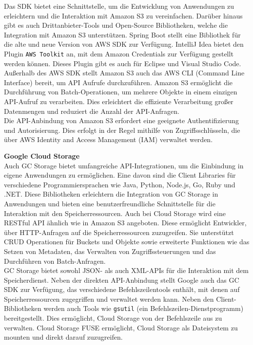 Das SDK bietet eine Schnittstelle, um die Entwicklung von Anwendungen zu erleichtern und die Interaktion mit Amazon S3 zu vereinfachen. Darüber hinaus gibt es auch Drittanbieter-Tools und Open-Source Bibliotheken, welche die Integration mit Amazon S3 unterstützen. Spring Boot stellt eine Bibliothek für die alte und neue Version von AWS SDK zur Verfügung. IntelliJ Idea bietet den Plugin \verb|AWS Toolkit| an, mit dem Amazon Credentials zur Verfügung gestellt werden können. Dieses Plugin gibt es auch für Eclipse und Visual Studio Code.\\

Außerhalb des AWS SDK stellt Amazon S3 auch das AWS CLI (Command Line Interface) bereit, um API Aufrufe durchzuführen. Amazon S3 ermöglicht die Durchführung von Batch-Operationen, um mehrere Objekte in einem einzigen API-Aufruf zu verarbeiten. Dies erleichtert die effiziente Verarbeitung großer Datenmengen und reduziert die Anzahl der API-Anfragen.\\

Die API-Anbindung von Amazon S3 erfordert eine geeignete Authentifizierung und Autorisierung. Dies erfolgt in der Regel mithilfe von Zugriffsschlüsseln, die über AWS Identity and Access Management (IAM) verwaltet werden.

\newpage

\textbf{Google Cloud Storage}\\

Auch GC Storage bietet umfangreiche API-Integrationen, um die Einbindung in eigene Anwendungen zu ermöglichen. Eine davon sind die Client Libraries für verschiedene Programmiersprachen wie Java, Python, Node.js, Go, Ruby und .NET. Diese Bibliotheken erleichtern die Integration von GC Storage in Anwendungen und bieten eine benutzerfreundliche Schnittstelle für die Interaktion mit den Speicherressourcen. Auch bei Cloud Storage wird eine RESTful API ähnlich wie in Amazon S3 angeboten. Diese ermöglicht Entwickler, über HTTP-Anfragen auf die Speicherressourcen zuzugreifen. Sie unterstützt CRUD Operationen für Buckets und Objekte sowie erweiterte Funktionen wie das Setzen von Metadaten, das Verwalten von Zugriffssteuerungen und das Durchführen von Batch-Anfragen.\\

GC Storage bietet sowohl JSON- als auch XML-APIs für die Interaktion mit dem Speicherdienst. Neben der direkten API-Anbindung stellt Google auch das GC SDK zur Verfügung, das verschiedene Befehlszeilentools enthält, mit denen auf Speicherressourcen zugegriffen und verwaltet werden kann. Neben den Client-Bibliotheken werden auch Tools wie \verb|gsutil| (ein Befehlszeilen-Dienstprogramm) bereitgestellt. Dies ermöglicht, Cloud Storage von der Befehlszeile aus zu verwalten. Cloud Storage FUSE ermöglicht, Cloud Storage als Dateisystem zu mounten und direkt darauf zuzugreifen.\\

